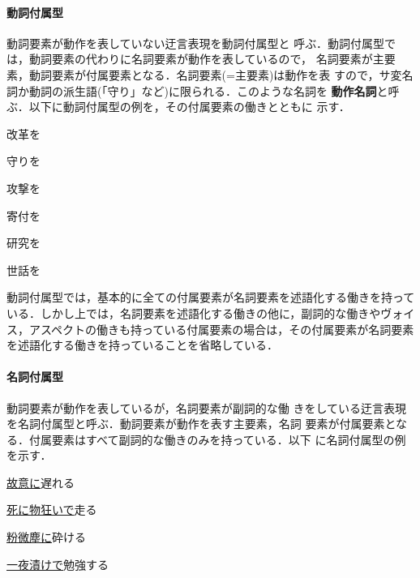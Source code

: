 \documentclass{nlp}
\begin{document}
\paragraph{動詞付属型}動詞要素が動作を表していない迂言表現を動詞付属型と
呼ぶ．動詞付属型では，動詞要素の代わりに名詞要素が動作を表しているので，
名詞要素が主要素，動詞要素が付属要素となる．名詞要素(=主要素)は動作を表
すので，サ変名詞か動詞の派生語(「守り」など)に限られる．このような名詞を
{\bf 動作名詞}と呼ぶ．以下に動詞付属型の例を，その付属要素の働きとともに
示す．
\begin{EXAMPLE}
 \item 改革を                  
 \item 守りを                    
 \item 攻撃を            
 \item 寄付を 
 \item 研究を                      
 \item 世話を                      
\end{EXAMPLE}
動詞付属型では，基本的に全ての付属要素が名詞要素を述語化する働きを持って
いる．しかし上では，名詞要素を述語化する働きの他に，副詞的な働きやヴォイ
ス，アスペクトの働きも持っている付属要素の場合は，その付属要素が名詞要素
を述語化する働きを持っていることを省略している．

\paragraph{名詞付属型}動詞要素が動作を表しているが，名詞要素が副詞的な働
きをしている迂言表現を名詞付属型と呼ぶ．動詞要素が動作を表す主要素，名詞
要素が付属要素となる．付属要素はすべて副詞的な働きのみを持っている．以下
に名詞付属型の例を示す．
\begin{EXAMPLE}
 \item \underline{故意に}遅れる       
 \item \underline{死に物狂いで}走る   
 \item \underline{粉微塵に}砕ける     
 \item \underline{一夜漬けで}勉強する 
\end{EXAMPLE}
\end{document}
